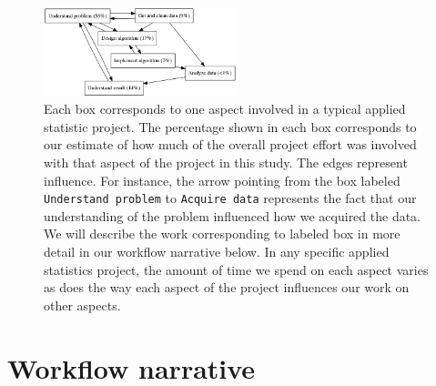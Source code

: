 \documentclass[]{article}
\begin{document}
\begin{figure}[h]
  \centering
    \includegraphics[width=0.5\textwidth]{work_process.png}
  \caption{Each box corresponds to one aspect involved in a typical applied
           statistic project.
           The percentage shown in each box corresponds to
           our estimate of how much of the overall project effort was involved
           with that aspect of the project in this study.
           The edges represent influence.
           For instance,
           the arrow pointing from the box labeled \texttt{Understand problem}
           to \texttt{Acquire data} represents the fact that our understanding
           of the problem influenced how we acquired the data.
           We will describe
           the work corresponding to labeled box in more detail in our
           workflow narrative below.
           In any specific applied statistics project,
           the amount of time we spend on each aspect varies as does the
           way each aspect of the project influences our work on other
           aspects.}
\end{figure}

\section{Workflow narrative}\label{workflow-narrative}
\end{document}
